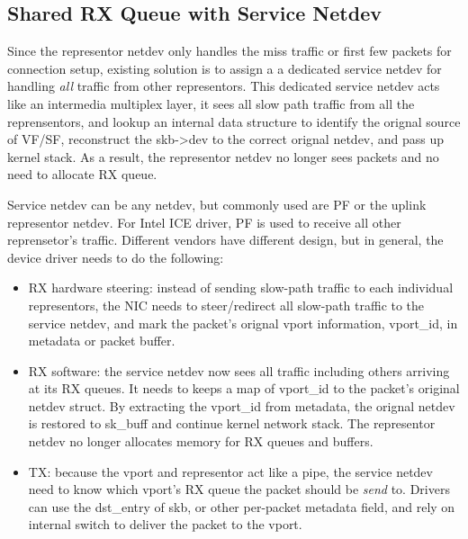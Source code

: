\documentclass[letterpaper]{article}
\begin{document}
\subsection{Shared RX Queue with Service Netdev}
Since the representor netdev only handles the miss traffic or first
few packets for connection setup, existing solution is to assign a
a dedicated service netdev for handling \emph{all} traffic from other
representors. This dedicated service netdev acts like an intermedia
multiplex layer, it sees all slow path traffic from all the
reprensentors, and lookup an internal data structure to identify the
orignal source of VF/SF, reconstruct the skb->dev to the correct
orignal netdev, and pass up kernel stack. As a result, the representor
netdev no longer sees packets and no need to allocate RX queue.

Service netdev can be any netdev, but commonly used are PF or the uplink
representor netdev. For Intel ICE driver, PF is used to receive all other
reprensetor's traffic.
Different vendors have different design, but in general, the device
driver needs to do the following:

\begin{itemize}
\item RX hardware steering: instead of sending slow-path traffic to
each individual representors, the NIC needs to steer/redirect all
slow-path traffic to the service netdev, and mark the packet's orignal
vport information, vport\_id, in metadata or packet buffer.
\item RX software: the service netdev now sees all traffic including
others arriving at its RX queues. It needs to keeps a map of vport\_id
to the packet's original netdev struct. By extracting the vport\_id
from metadata, the orignal netdev is restored to sk\_buff and continue
kernel network stack. The representor netdev no longer allocates memory
for RX queues and buffers.
\item TX: because the vport and representor act like a pipe, the service
netdev need to know which vport's RX queue the packet should be \emph{send}
to. Drivers can use the dst\_entry of skb, or other per-packet metadata
field, and rely on internal switch to deliver the packet to the vport.
\end{itemize}
\end{document}
